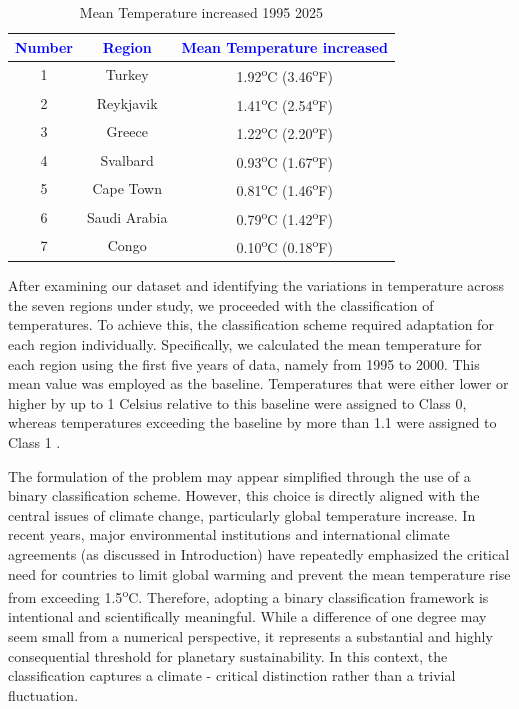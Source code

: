 \documentclass[12pt]{Definitions/academia}
\begin{document}
\begin{table}[H]
		\centering
\begin{tabular}{|c|c|c|}
\hline
\textbf{\textcolor{blue}{Number}} & \textbf{\textcolor{blue}{Region}} & \textbf{\textcolor{blue}{Mean Temperature increased}}\tabularnewline
\hline
\hline
1 & Turkey & 1.92\textsuperscript{o}C (3.46\textsuperscript{o}F)\tabularnewline
\hline
2 & Reykjavik & 1.41\textsuperscript{o}C (2.54\textsuperscript{o}F)\tabularnewline
\hline
3 & Greece & 1.22\textsuperscript{o}C (2.20\textsuperscript{o}F)\tabularnewline
\hline
4 & Svalbard & 0.93\textsuperscript{o}C (1.67\textsuperscript{o}F)\tabularnewline
\hline
5 & Cape Town & 0.81\textsuperscript{o}C (1.46\textsuperscript{o}F)\tabularnewline
\hline
6 & Saudi Arabia & 0.79\textsuperscript{o}C (1.42\textsuperscript{o}F)\tabularnewline
\hline
7 & Congo & 0.10\textsuperscript{o}C (0.18\textsuperscript{o}F)\tabularnewline
\hline
\end{tabular}

\caption{Mean Temperature increased 1995 2025\label{tab:Table-3-Mean-Temperature-increased-1995-2025}}

\end{table}

After examining our dataset and identifying the variations in temperature
across the seven regions under study, we proceeded with the classification
of temperatures. To achieve this, the classification scheme required
adaptation for each region individually. Specifically, we calculated
the mean temperature for each region using the first five years of
data, namely from 1995 to 2000. This mean value was employed as the
baseline. Temperatures that were either lower or higher by up to 1 Celsius
relative to this baseline were assigned to Class 0,
whereas temperatures exceeding the baseline by more than 1.1 
were assigned to Class 1 .

 The formulation of the problem may appear simplified through the use of a binary classification scheme. However, this choice is directly aligned with the central issues of climate change, particularly global temperature increase. In recent years, major environmental institutions and international climate agreements (as discussed in  Introduction) have repeatedly emphasized the critical need for countries to limit global warming and prevent the mean temperature rise from exceeding 1.5\textsuperscript{o}C.
Therefore, adopting a binary classification framework is intentional and scientifically meaningful. While a difference of one degree may seem small from a numerical perspective, it represents a substantial and highly consequential threshold for planetary sustainability. In this context, the classification captures a climate - critical distinction rather than a trivial fluctuation.
\end{document}
